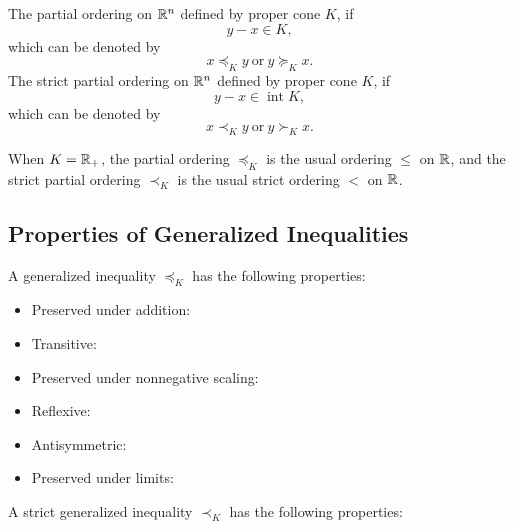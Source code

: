 \begin{definition} \label{def:generalized-inequalities}
	The partial ordering on ${\mathbb R}^n$ defined by proper cone $K$, if
	\begin{equation}
		y-x\in K,
	\end{equation}
	which can be denoted by
	\begin{equation}
		x\preceq_{K}y\ \text{or}\ y\succeq_{K}x.
	\end{equation}
	The strict partial ordering on ${\mathbb R}^n$ defined by proper cone $K$, if
	\begin{equation}
		y-x\in\operatorname{int}K,
	\end{equation}
	which can be denoted by
	\begin{equation}
		x\prec_{K}y\ \text{or}\ y\succ_{K}x.
	\end{equation}
\end{definition}

\begin{remark}
	When $K={\mathbb R}_{+}$, the partial ordering $\preceq_{K}$ is the usual ordering $\leq$ on ${\mathbb R}$, and the strict partial ordering $\prec_{K}$ is the usual strict ordering $<$ on ${\mathbb R}$.
\end{remark}

\subsection{Properties of Generalized Inequalities}

\begin{theorem}
	A generalized inequality $\preceq_{K}$ has the following properties:
	\begin{itemize}
		\item Preserved under addition:
		\item Transitive:
		\item Preserved under nonnegative  scaling:
		\item Reflexive:
		\item Antisymmetric:
		\item Preserved under limits:
	\end{itemize}
	A strict generalized inequality $\prec_{K}$ has the following properties:
\end{theorem}
